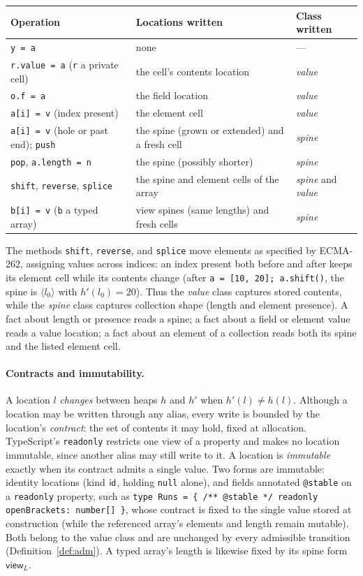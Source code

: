 \documentclass[10pt,a4paper]{article}
\theoremstyle{definition}
\theoremstyle{remark}
\newcommand{\code}[1]{\texttt{#1}}
\begin{document}
\begin{center}\small
\begin{tabularx}{\textwidth}{@{}lXl@{}}
\toprule
Operation & Locations written & Class written\\
\midrule
\code{y = a} & none & ---\\
\code{r.value = a} (\code{r} a private cell) & the cell's contents location & \emph{value}\\
\code{o.f = a} & the field location & \emph{value}\\
\code{a[i] = v} (index present) & the element cell & \emph{value}\\
\code{a[i] = v} (hole or past end); \code{push} & the spine (grown or extended) and a fresh cell & \emph{spine}\\
\code{pop}, \code{a.length = n} & the spine (possibly shorter) & \emph{spine}\\
\code{shift}, \code{reverse}, \code{splice} & the spine and element cells of the array & \emph{spine} and \emph{value}\\
\code{b[i] = v} (\code{b} a typed array) & view spines (same lengths) and fresh cells & \emph{spine}\\
\bottomrule
\end{tabularx}
\end{center}

\noindent
The methods \code{shift}, \code{reverse}, and \code{splice} move
elements as specified by ECMA-262, assigning values across indices: an
index present both before and after keeps its element cell while its
contents change (after \code{a = [10, 20]; a.shift()}, the spine is
$\langle l_0\rangle$ with $h'(l_0)=20$). Thus the \emph{value} class
captures stored contents, while the \emph{spine} class captures
collection shape (length and element presence). A fact about length or
presence reads a spine; a fact about a field or element value reads a
value location; a fact about an element of a collection reads both its
spine and the listed element cell.

\paragraph{Contracts and immutability.}
A location $l$ \emph{changes} between heaps $h$ and $h'$ when
$h'(l)\ne h(l)$. Although a location may be written through any alias,
every write is bounded by the location's \emph{contract}: the set of
contents it may hold, fixed at allocation. TypeScript's \code{readonly}
restricts one view of a property and makes no location immutable, since
another alias may still write to it. A location is \emph{immutable}
exactly when its contract admits a single value. Two forms are
immutable: identity locations (kind $\mathsf{id}$, holding \code{null} alone),
and fields annotated \code{@stable} on a \code{readonly} property, such
as \code{type Runs = \{ /** @stable */ readonly openBrackets: number[] \}},
whose contract is fixed to the single value stored at construction
(while the referenced array's elements and length remain mutable). Both
belong to the value class and are unchanged by every admissible
transition (Definition~\ref{def:adm}). A typed array's length is
likewise fixed by its spine form $\mathsf{view}_L$.
\end{document}
